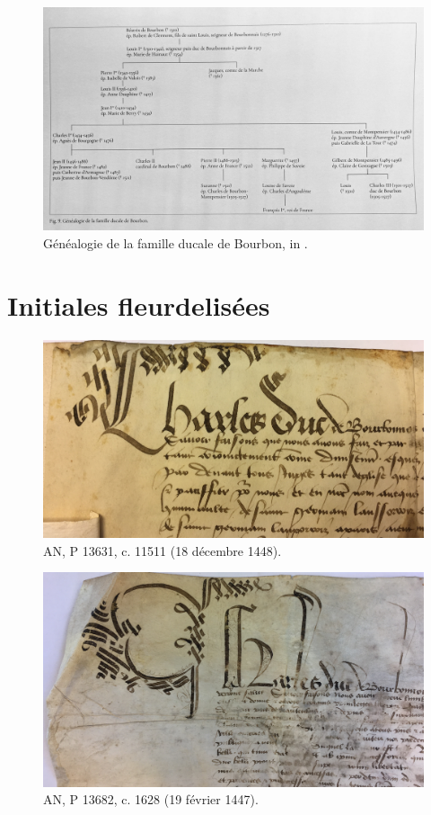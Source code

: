 \begin{figure}[H]
\centering
\includegraphics[scale =0.22]{img/genealogie.jpeg}
\caption*{Généalogie de la famille ducale de Bourbon, in \cite{matteoniBourbonsLeurBibliotheque2022}.}
\label{genealogie}
\end{figure}
\newpage 

\section*{Initiales fleurdelisées}

 \begin{figure}[H]
\centering
\includegraphics[scale =0.09]{img/fleurlys1.jpg}
\caption*{AN, P 13631, c. 11511 (18 décembre 1448).}
\label{fl1}
\end{figure}

\begin{figure}[H]
\centering
\includegraphics[scale =0.09]{img/fleurlys2.jpg}
\caption*{AN, P 13682, c. 1628 (19 février 1447).}
\label{fl2}
\end{figure}
\newpage 


